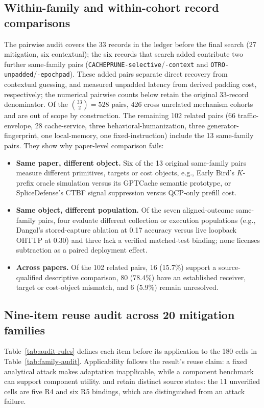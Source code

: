 \subsection{Within-family and within-cohort record comparisons}
The pairwise audit covers the 33 records in the ledger before the final search (27 mitigation, six contextual); the six records that search added contribute two further same-family pairs (\texttt{CACHEPRUNE-selective}/\texttt{-context} and \texttt{OTRO-unpadded}/\texttt{-epochpad}). These added pairs separate direct recovery from contextual guessing, and measured unpadded latency from derived padding cost, respectively; the numerical pairwise counts below retain the original 33-record denominator. Of the $\binom{33}{2}=528$ pairs, 426 cross unrelated mechanism cohorts and are out of scope by construction. The remaining 102 related pairs (66 traffic-envelope, 28 cache-service, three behavioral-humanization, three generator-fingerprint, one local-memory, one fixed-instruction) include the 13 same-family pairs. They show why paper-level comparison fails:
\begin{itemize}
\item \textbf{Same paper, different object.} Six of the 13 original same-family pairs measure different primitives, targets or cost objects, e.g., Early Bird's $K$-prefix oracle simulation versus its GPTCache semantic prototype, or SpliceDefense's CTBF signal suppression versus QCP-only prefill cost.
\item \textbf{Same object, different population.} Of the seven aligned-outcome same-family pairs, four evaluate different collection or execution populations (e.g., Dangol's stored-capture ablation at 0.17 accuracy versus live loopback OHTTP at 0.30) and three lack a verified matched-test binding; none licenses subtraction as a paired deployment effect.
\item \textbf{Across papers.} Of the 102 related pairs, 16 (15.7\%) support a source-qualified descriptive comparison, 80 (78.4\%) have an established receiver, target or cost-object mismatch, and 6 (5.9\%) remain unresolved.
\end{itemize}

\subsection{Nine-item reuse audit across 20 mitigation families}
Table~\ref{tab:audit-rules} defines each item before its application to the 180 cells in Table~\ref{tab:family-audit}. Applicability follows the result's reuse claim: a fixed analytical attack makes adaptation inapplicable, while a component benchmark can support component utility. \NRR{} and \NRV{} retain distinct source states: the 11 unverified cells are five R4 and six R5 bindings, which are distinguished from an attack failure.



